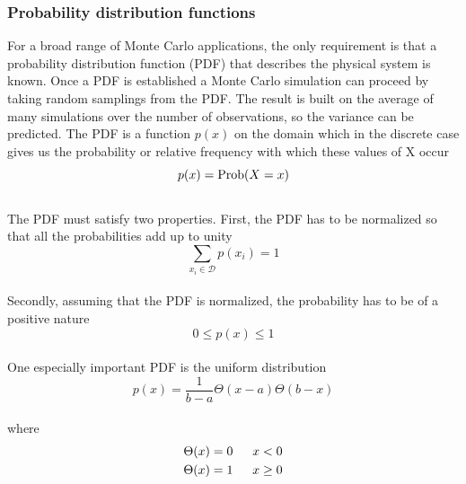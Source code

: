 \documentclass[%
reprint,nofootinbib,
amsmath,amssymb,
aps,
]{revtex4-1}
\begin{document}
\subsubsection{Probability distribution functions}\noindent
For a broad range of Monte Carlo applications, the only requirement is that a probability distribution function (PDF) that describes the physical system is known. Once a PDF is established a Monte Carlo simulation can proceed by taking random samplings from the PDF. The result is built on the average of many simulations over the number of observations, so the variance can be predicted. The PDF is a function $p(x)$ on the domain which in the discrete case gives us the probability or relative frequency with which these values of X occur \vspace{0.5mm} \\
\begin{equation*}
	p(x) = \textnormal{Prob}(X=x)
\end{equation*}\vspace{0.5mm} \\
The PDF must satisfy two properties. First, the PDF has to be normalized so that all the probabilities add up to unity\vspace{0.5mm} \\
\begin{equation*}
	\sum_{x_i\in \mathcal{D}} p(x_i) = 1
\end{equation*} \vspace{0.5mm} \\
Secondly, assuming that the PDF is normalized, the probability has to be of a positive nature \vspace{0.5mm} \\
\begin{equation*}
	0 \leq p(x) \leq 1
\end{equation*}\vspace{0.5mm} \\
One especially important PDF is the uniform distribution\vspace{2mm} \\
\begin{equation}\label{unipdf}
	p(x) = \dfrac{1}{b-a}\Theta(x-a)\Theta(b-x)
\end{equation}\vspace{0.5mm} \\
where
\begin{align*}
	\Theta(x) &= 0& \hspace{2mm} x < 0\\
	\Theta(x) &= 1& \hspace{2mm} x \geq 0\\
\end{align*}\vspace{2mm} \\
\end{document}
